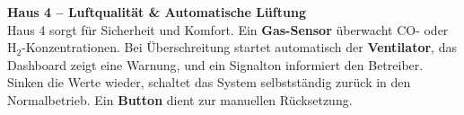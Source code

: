 
\vspace{0.5em}
\textbf{Haus 4 – Luftqualität \& Automatische Lüftung}\\
Haus 4 sorgt für Sicherheit und Komfort. Ein \textbf{Gas-Sensor} überwacht CO- oder H$_2$-Konzentrationen.
Bei Überschreitung startet automatisch der \textbf{Ventilator}, das Dashboard zeigt eine Warnung, und ein Signalton informiert den Betreiber.
Sinken die Werte wieder, schaltet das System selbstständig zurück in den Normalbetrieb.
Ein \textbf{Button} dient zur manuellen Rücksetzung.

